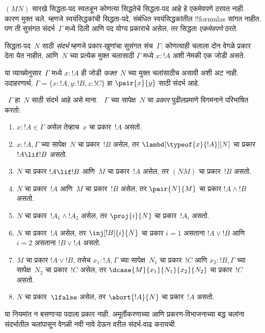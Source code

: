\documentclass[../../../include/open-logic-section]{subfiles}
\begin{document}


$(MN)$ सारखे सिद्धता-पद स्वतःहून कोणत्या सिद्धतेचे
सिद्धता-पद आहे हे एकमेवपणे ठरवत नाही. कारण मुक्त चले,
म्हणजे स्वयंसिद्धकांची सिद्धता-पदे, संबंधित स्वयंसिद्धकांतील
!!{formula}s सांगत नाहीत. पण ती सुसंगत संदर्भ~$\Gamma$ मध्ये
दिली आणि पद योग्य प्रकाराचे असेल, तर सिद्धता \emph{एकमेवपणे} ठरते.

\begin{defn}
सिद्धता-पद~$N$ साठी \emph{संदर्भ} म्हणजे प्रकार-खुणांचा
सुसंगत संच~$\Gamma$: कोणत्याही चलाला दोन वेगळे प्रकार
देता येत नाहीत, आणि~$N$ च्या प्रत्येक मुक्त चलासाठी
$\Gamma$ मध्ये $x:!A$ अशी नेमकी एक जोडी असते.
\end{defn}

या व्याख्येनुसार~$\Gamma$ मध्ये $x:!A$ ही जोडी
\emph{फक्त}~$N$ च्या मुक्त चलांसाठीच असावी अशी अट नाही.
उदाहरणार्थ, $\Gamma = \{x:!A, y:!B, z:!C\}$ हा
$\pair{x}{y}$ साठी संदर्भ आहे.

\begin{defn}
  ~$\Gamma$ हा~$N$ साठी संदर्भ आहे असे माना.
  ~$\Gamma$ च्या सापेक्ष~$N$ चा \emph{प्रकार}
  पुढीलप्रमाणे विगमनाने परिभाषित करतो:
  \begin{enumerate}
  \item $x:!A \in \Gamma$ असेल तेव्हाच~$x$ चा प्रकार~$!A$ असतो.
  \item $x:!A, \Gamma$ च्या सापेक्ष~$N$ चा प्रकार~$!B$
    असेल, तर $\lambd[\typeof{x}{!A}][N]$ चा प्रकार
    $!A \lif !B$ असतो.
  \item $N$ चा प्रकार $!A \lif !B$ आणि~$M$ चा प्रकार~$!A$
    असेल, तर $(NM)$ चा प्रकार~$!B$ असतो.
  \item $N$ चा प्रकार~$!A$ आणि~$M$ चा प्रकार~$!B$
    असेल, तर $\pair{N}{M}$ चा प्रकार $!A \land !B$ असतो.
  \item $N$ चा प्रकार~$!A_1 \land !A_2$ असेल, तर
    $\proj{i}{N}$ चा प्रकार~$!A_i$ असतो.
  \item $N$ चा प्रकार~$!A$ असेल, तर
    $\inj[!B]{i}{N}$ चा प्रकार $i=1$ असताना
    $!A \lor !B$ आणि $i=2$ असताना $!B \lor !A$ असतो.
  \item $M$ चा प्रकार $!A \lor !B$, तसेच
    $x_1:!A, \Gamma$ च्या सापेक्ष~$N_1$ चा प्रकार~$!C$
    आणि $x_2:!B, \Gamma$ च्या सापेक्ष~$N_2$ चा
    प्रकार~$!C$ असेल, तर
    $\dcase{M}{x_1}{N_1}{x_2}{N_2}$ चा प्रकार~$!C$ असतो.
  \item $N$ चा प्रकार~$\lfalse$ असेल, तर
    $\abort{!A}{N}$ चा प्रकार~$!A$ असतो.
  \end{enumerate}
\end{defn}
या नियमांत न बसणाऱ्या पदाला प्रकार नाही. अमूर्तीकरणाच्या
आणि प्रकरण-विभाजनाच्या बद्ध चलांना संदर्भातील चलांपासून वेगळी
नवी नावे देऊन वरील संदर्भ-वाढ करायची.
\end{document}
